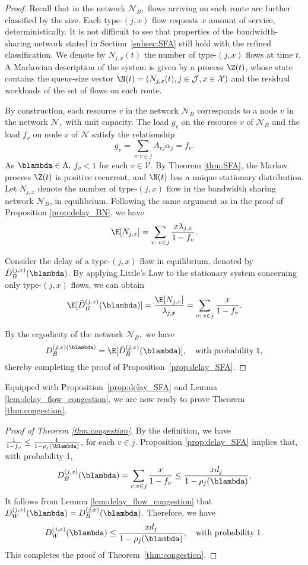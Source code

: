 \begin{proof}
 Recall that in the network $\mathcal{N}_{B},$ flows arriving on each route are
further classified by the size. Each type-$(j,x)$ flow
requests $x$ amount of service, deterministically. It is not difficult to see that properties of the bandwidth-sharing network stated in Section~\ref{subsec:SFA} still hold with the refined classification. We denote by $N_{j,x}(t)$
the number of type-$(j,x)$ flows at time $t.$ A Markovian description
of the system is given by a process $\Z(t)$, whose state contains the queue-size
vector $\N(t)=(N_{j,x}(t),j\in\mathcal{J},x\in\mathcal{X})$ and the residual workloads of the set of flows
on each route. 

By construction, each resource $v$ in the network $\mathcal{N}_{B}$ corresponds to
a node $v$ in the network $\mathcal{N},$ with unit capacity. The load $ g_v $ on the resource
$v$ of $ \mathcal{N}_{B} $ and the load $ f_v $ on node $ v $ of $ \mathcal{N} $ satisfy the relationship 
\[
g_{v}=\sum_{v:v\in j}A_{vj}\alpha_{j}=f_{v}.
\]
As $\blambda\in\Lambda,$ $f_{v}<1$ for each $v\in\mathcal{V}.$
By Theorem \ref{thm:SFA}, the Markov process $\Z(t)$ is positive
recurrent, and $\N(t)$ has a unique stationary distribution. Let $N_{j,x}$
denote the number of type-$(j,x)$ flow in the bandwidth sharing network
$\mathcal{N}_{B}$, in equilibrium. Following the same argument as
in the proof of Proposition \ref{prop:delay_BN}, we have 
\[
\E[N_{j,x}]=\sum_{v:\;v\in j}\frac{x\lambda_{j,x}}{1-f_{v}}.
\]

Consider the delay of a type-$(j,x)$ flow in equilibrium, denoted
by $\bar{D}_{B}^{(j,x)} (\blambda)$. By applying Little's Law to the stationary
system concerning only type-$(j,x)$ flows, we can obtain 
\[
\E[\bar{D}_{B}^{(j,x)} (\blambda)]=\frac{\E[N_{j,x}]}{\lambda_{j,x}}=\sum_{v:\;v\in j}\frac{x}{1-f_{v}}.
\]


By the ergodicity of the network $\mathcal{N}_{B},$ we have
\[
D_{B}^{(j,x) (\blambda)}=\E[\bar{D}_{B}^{(j,x)} (\blambda)],\quad\text{with probability}\;1,
\]
thereby completing the proof of Proposition~\ref{prop:delay_SFA}.
\end{proof}

Equipped with Proposition~\ref{prop:delay_SFA} and Lemma \ref{lem:delay_flow_congestion}, we are now ready to prove Theorem \ref{thm:congestion}.
\begin{proof}[Proof of Theorem \ref{thm:congestion}] 

By the definition, we have $\frac{1}{1-f_{v}}\leq\frac{1}{1-\rho_{j}(\blambda)}$,
for each $v\in j.$ Proposition \ref{prop:delay_SFA} implies that, with probability 1,
\[
D_{B}^{(j,x)} (\blambda)=\sum_{v:v\in j}\frac{x}{1-f_{v}}\leq\frac{xd_{j}}{1-\rho_{j}(\blambda)},
\]
It follows from Lemma \ref{lem:delay_flow_congestion} that $D_{W}^{(j,x)} (\blambda) = D_{B}^{(j,x)} (\blambda).$
Therefore, we have
\[
D_{W}^{(j,x)} (\blambda) \leq\frac{xd_{j}}{1-\rho_{j}(\blambda)},\quad\text{with probability}\;1.
\] 
This completes the proof of Theorem~\ref{thm:congestion}.
\end{proof}


